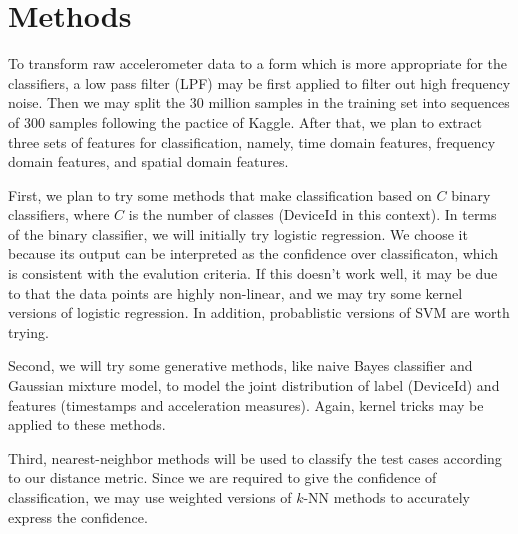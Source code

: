 \documentclass[12pt]{article}
\begin{document}
\section{Methods}
To transform raw accelerometer data to a form which is more appropriate for the classifiers, a low pass filter (LPF) may be first applied to filter out high frequency noise. Then we may split the 30 million samples in the training set into sequences of 300 samples following the pactice of Kaggle. After that, we plan to extract three sets of features for classification, namely, time domain features, frequency domain features, and spatial domain features.

First, we plan to try some methods that make classification based on $C$ binary classifiers, where $C$ is the number of classes (DeviceId in this context). In terms of the binary classifier, we will initially try logistic regression. We choose it because its output can be interpreted as the confidence over classificaton, which is consistent with the evalution criteria. If this doesn't work well, it may be due to that the data points are highly non-linear, and we may try some kernel versions of logistic regression. In addition, probablistic versions of SVM are worth trying.

Second, we will try some generative methods, like naive Bayes classifier and Gaussian mixture model, to model the joint distribution of label (DeviceId) and features (timestamps and acceleration measures). Again, kernel tricks may be applied to these methods.

Third, nearest-neighbor methods will be used to classify the test cases according to our distance metric. Since we are required to give the confidence of classification, we may use weighted versions of $k$-NN methods to accurately express the confidence.
\end{document}
